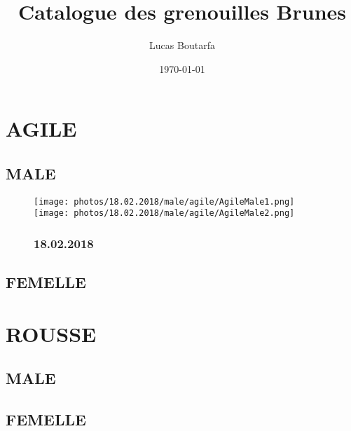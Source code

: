 \documentclass{article}%
\title{Catalogue des grenouilles Brunes}%
\author{Lucas Boutarfa}%
\date{\today}%
\begin{document}
%
\normalsize%
\maketitle%
\tableofcontents%
\clearpage%
\pagestyle{headings}%
\section{AGILE}%
\subsection{MALE}%


\begin{figure}[h!]%
\centering%
\texttt{[image: photos/18.02.2018/male/agile/AgileMale1.png]}%
\hspace{0.5cm}%
\vspace{0.2cm}%
\centering%
\texttt{[image: photos/18.02.2018/male/agile/AgileMale2.png]}%
\hspace{0.5cm}%
\vspace{0.2cm}%
\newline%
\subsubsection{18.02.2018}%

%
\end{figure}

%
\clearpage%
\subsection{FEMELLE}%

%
\clearpage

%
\section{ROUSSE}%
\subsection{MALE}%

%
\clearpage%
\subsection{FEMELLE}%
\end{document}
